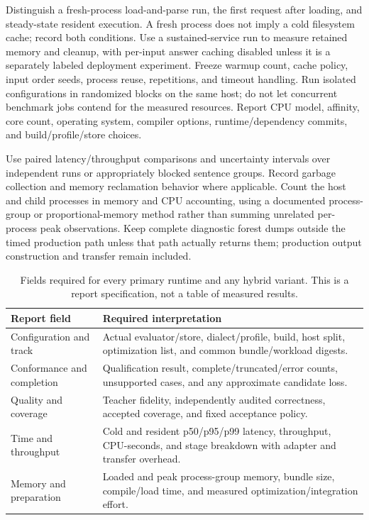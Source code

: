 \documentclass[11pt,a4paper]{article}
\begin{document}
Distinguish a fresh-process load-and-parse run, the first request after
loading, and steady-state resident execution. A fresh process does not imply
a cold filesystem cache; record both conditions. Use a sustained-service run
to measure retained memory and cleanup, with per-input answer caching disabled
unless it is a separately labeled deployment experiment. Freeze warmup count, cache
policy, input order seeds, process reuse, repetitions, and timeout handling.
Run isolated configurations in randomized blocks on the same host; do not
let concurrent benchmark jobs contend for the measured resources.
Report CPU model, affinity, core count, operating system, compiler options,
runtime/dependency commits, and build/profile/store choices.

Use paired latency/throughput comparisons and uncertainty intervals over
independent runs or appropriately blocked sentence groups. Record garbage
collection and memory reclamation behavior where applicable. Count the
host and child processes in memory and CPU accounting, using a documented
process-group or proportional-memory method rather than summing unrelated
per-process peak observations. Keep complete
diagnostic forest dumps outside the timed production path unless that
path actually returns them; production output construction and transfer
remain included.

\begin{table}[htbp]
\small
\begin{tabularx}{\textwidth}{L{35mm}Y}
\toprule
Report field & Required interpretation \\
\midrule
Configuration and track &
Actual evaluator/store, dialect/profile, build, host split, optimization
list, and common bundle/workload digests. \\
Conformance and completion &
Qualification result, complete/truncated/error counts, unsupported cases,
and any approximate candidate loss. \\
Quality and coverage &
Teacher fidelity, independently audited correctness, accepted coverage,
and fixed acceptance policy. \\
Time and throughput &
Cold and resident p50/p95/p99 latency, throughput, CPU-seconds, and stage
breakdown with adapter and transfer overhead. \\
Memory and preparation &
Loaded and peak process-group memory, bundle size, compile/load time,
and measured optimization/integration effort. \\
\bottomrule
\end{tabularx}
\caption{Fields required for every primary runtime and any hybrid variant.
This is a report specification, not a table of measured results.}
\end{table}
\end{document}
